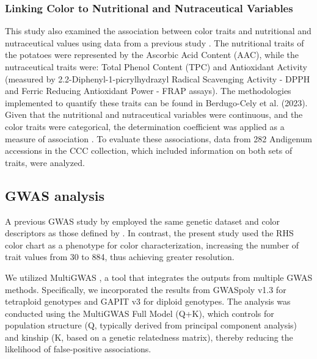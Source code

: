 \documentclass[pdflatex,sn-mathphys-ay]{sn-jnl}%
\begin{document}
\subsubsection*{Linking Color to Nutritional and Nutraceutical Variables}

This study also examined the association between color traits and nutritional and nutraceutical values using data from a previous study \citep{berdugo2023phenotypic}. The nutritional traits of the potatoes were represented by the Ascorbic Acid Content (AAC), while the nutraceutical traits were: Total Phenol Content (TPC) and Antioxidant Activity (measured by 2.2-Diphenyl-1-picrylhydrazyl Radical Scavenging Activity - DPPH and Ferric Reducing Antioxidant Power - FRAP assays). The methodologies implemented to quantify these traits can be found in Berdugo-Cely et al. (2023). Given that the nutritional and nutraceutical variables were continuous, and the color traits were categorical, the determination coefficient was applied as a measure of association \citep{nagelkerke1991note}. To evaluate these associations, data from 282 Andigenum accessions in the CCC collection, which included information on both sets of traits, were analyzed.


\subsection{GWAS analysis \label{subsec:GWAS-process} }




A previous GWAS study by \cite{Berdugo2017} employed the same genetic dataset and color descriptors as those defined by \cite{gomez2000guia}. In contrast, the present study used the RHS color chart as a phenotype for color characterization, increasing the number of trait values from 30 to 884, thus achieving greater resolution.

We utilized MultiGWAS \citep{Garreta2021}, a tool that integrates the outputs from multiple GWAS methods. Specifically, we incorporated the results from GWASpoly v1.3 \citep{Rosyara2016} for tetraploid genotypes and GAPIT v3 \citep{Tan2016} for diploid genotypes. The analysis was conducted using the MultiGWAS Full Model (Q+K), which controls for population structure (Q, typically derived from principal component analysis) and kinship (K, based on a genetic relatedness matrix), thereby reducing the likelihood of false-positive associations.
\end{document}

